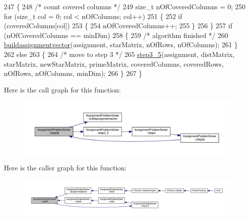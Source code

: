 \begin{DoxyCode}
247 \{
248     \textcolor{comment}{/* count covered columns */}
249     \textcolor{keywordtype}{size\_t} nOfCoveredColumns = 0;
250     \textcolor{keywordflow}{for} (\textcolor{keywordtype}{size\_t} col = 0; col < nOfColumns; col++)
251     \{
252         \textcolor{keywordflow}{if} (coveredColumns[col])
253         \{
254             nOfCoveredColumns++;
255         \}
256     \}
257     \textcolor{keywordflow}{if} (nOfCoveredColumns == minDim)
258     \{
259         \textcolor{comment}{/* algorithm finished */}
260         \mbox{\hyperlink{class_assignment_problem_solver_a1aa1c05dec6aef723f5d41affc667a77}{buildassignmentvector}}(assignment, starMatrix, nOfRows, nOfColumns);
261     \}
262     \textcolor{keywordflow}{else}
263     \{
264         \textcolor{comment}{/* move to step 3 */}
265         \mbox{\hyperlink{class_assignment_problem_solver_a8c24dfcfef6adfb96c6394f798c02dba}{step3\_5}}(assignment, distMatrix, starMatrix, newStarMatrix, primeMatrix, coveredColumns, 
      coveredRows, nOfRows, nOfColumns, minDim);
266     \}
267 \}
\end{DoxyCode}
Here is the call graph for this function\+:\nopagebreak
\begin{figure}[H]
\begin{center}
\leavevmode
\includegraphics[width=350pt]{class_assignment_problem_solver_a069b78d89842031f7b54e0837c2bd602_cgraph}
\end{center}
\end{figure}
Here is the caller graph for this function\+:\nopagebreak
\begin{figure}[H]
\begin{center}
\leavevmode
\includegraphics[width=350pt]{class_assignment_problem_solver_a069b78d89842031f7b54e0837c2bd602_icgraph}
\end{center}
\end{figure}
\mbox{\label{class_assignment_problem_solver_a8c24dfcfef6adfb96c6394f798c02dba}} 
